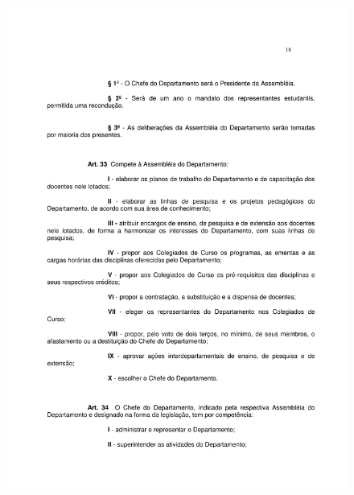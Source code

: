 \begin{figure}[p]
	\centering 
	\includegraphics[scale=0.7]{capitulos/resolucoes/cuni414/cuni414-18.pdf}
\end{figure}

